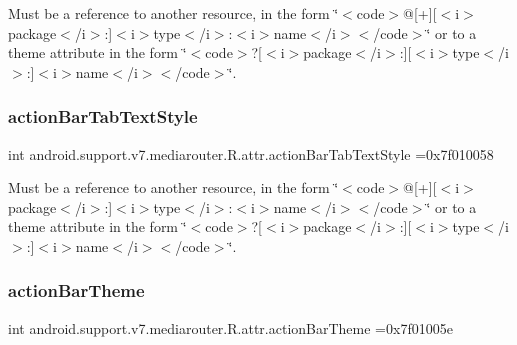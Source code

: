 Must be a reference to another resource, in the form \char`\"{}$<$code$>$@\mbox{[}+\mbox{]}\mbox{[}$<$i$>$package$<$/i$>$\+:\mbox{]}$<$i$>$type$<$/i$>$\+:$<$i$>$name$<$/i$>$$<$/code$>$\char`\"{} or to a theme attribute in the form \char`\"{}$<$code$>$?\mbox{[}$<$i$>$package$<$/i$>$\+:\mbox{]}\mbox{[}$<$i$>$type$<$/i$>$\+:\mbox{]}$<$i$>$name$<$/i$>$$<$/code$>$\char`\"{}. \mbox{\label{classandroid_1_1support_1_1v7_1_1mediarouter_1_1R_1_1attr_a64b19641eebaac41f94630edbf34194b}} 
\subsubsection{\texorpdfstring{action\+Bar\+Tab\+Text\+Style}{actionBarTabTextStyle}}
{\footnotesize\ttfamily int android.\+support.\+v7.\+mediarouter.\+R.\+attr.\+action\+Bar\+Tab\+Text\+Style =0x7f010058\hspace{0.3cm}{\ttfamily [static]}}

Must be a reference to another resource, in the form \char`\"{}$<$code$>$@\mbox{[}+\mbox{]}\mbox{[}$<$i$>$package$<$/i$>$\+:\mbox{]}$<$i$>$type$<$/i$>$\+:$<$i$>$name$<$/i$>$$<$/code$>$\char`\"{} or to a theme attribute in the form \char`\"{}$<$code$>$?\mbox{[}$<$i$>$package$<$/i$>$\+:\mbox{]}\mbox{[}$<$i$>$type$<$/i$>$\+:\mbox{]}$<$i$>$name$<$/i$>$$<$/code$>$\char`\"{}. \mbox{\label{classandroid_1_1support_1_1v7_1_1mediarouter_1_1R_1_1attr_a06445938d30d959fab5c0651b8961488}} 
\subsubsection{\texorpdfstring{action\+Bar\+Theme}{actionBarTheme}}
{\footnotesize\ttfamily int android.\+support.\+v7.\+mediarouter.\+R.\+attr.\+action\+Bar\+Theme =0x7f01005e\hspace{0.3cm}{\ttfamily [static]}}

